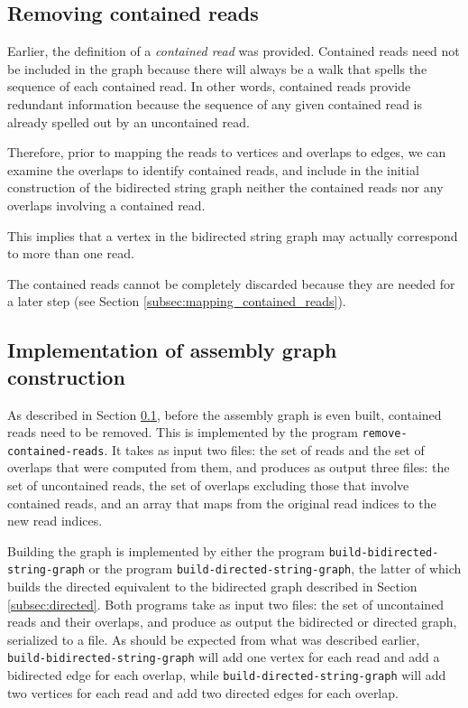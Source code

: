 \documentclass[12pt]{article}
\newcommand{\Subsection}[1]{Section \ref{#1}}
\newcommand{\KeyTerm}[1]{{\it #1}}
\newcommand{\ProgramName}[1]{{\tt #1}}
\begin{document}
\subsection{Removing contained reads}

\label{subsec:removing_contained_reads}

Earlier, the definition of a \KeyTerm{contained read} was provided.  Contained
reads need not be included in the graph because there will always be a walk that
spells the sequence of each contained read.  In other words, contained reads
provide redundant information because the sequence of any given contained read
is already spelled out by an uncontained read.

Therefore, prior to mapping the reads to vertices and overlaps to edges, we can
examine the overlaps to identify contained reads, and include in the initial
construction of the bidirected string graph neither the contained reads nor any
overlaps involving a contained read.

This implies that a vertex in the bidirected string graph may actually
correspond to more than one read.

The contained reads cannot be completely discarded because they are needed for a
later step (see \Subsection{subsec:mapping_contained_reads}).

\subsection{Implementation of assembly graph construction}

As described in \Subsection{subsec:removing_contained_reads}, before the
assembly graph is even built, contained reads need to be removed.  This is
implemented by the program \ProgramName{remove-contained-reads}.  It takes as
input two files: the set of reads and the set of overlaps that were computed
from them, and produces as output three files: the set of uncontained reads, the
set of overlaps excluding those that involve contained reads, and an array that
maps from the original read indices to the new read indices.

Building the graph is implemented by either the program
\ProgramName{build-bidirected-string-graph} or the program
\ProgramName{build-directed-string-graph}, the latter of which builds the
directed equivalent to the bidirected graph described in
\Subsection{subsec:directed}.  Both programs take as input two files: the set of
uncontained reads and their overlaps, and produce as output the bidirected or
directed graph, serialized to a file.  As should be expected from what was
described earlier, \ProgramName{build-bidirected-string-graph} will add one
vertex for each read and add a bidirected edge for each overlap, while
\ProgramName{build-directed-string-graph} will add two vertices for each read
and add two directed edges for each overlap.
\end{document}

